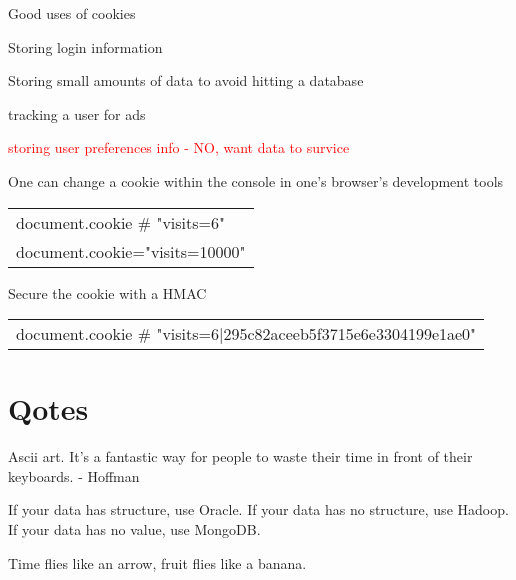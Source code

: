 \documentclass[12pt]{article}
\begin{document}
Good uses of cookies
\begin{list}{*}{
\setlength{\itemsep}{0pt}
\setlength{\parsep}{0pt}
\setlength{\topsep}{0pt}
\setlength{\partopsep}{0pt}
\setlength{\leftmargin}{2em}
\setlength{\labelwidth}{1.5em}
\setlength{\labelsep}{0.5em}
}
\item Storing login information
\item Storing small amounts of data to avoid hitting a database
\item tracking a user for ads
\item \textcolor{red}{storing user preferences info - NO, want data to survice}
\end{list}

One can change a cookie within the console in one's browser's development tools

\begin{tabular}{l}
document.cookie $\#$ "visits=6" \\
document.cookie="visits=10000"
\end{tabular}

Secure the cookie with a HMAC



\begin{tabular}{l}
document.cookie $\#$ "visits=6|295c82aceeb5f3715e6e3304199e1ae0" \\
\end{tabular}

\section{Qotes}

Ascii art. It's a fantastic way for people to waste their time in front of their keyboards. - Hoffman

If your data has structure, use Oracle. If your data has no structure, use Hadoop. If your data has no value, use MongoDB.

Time flies like an arrow, fruit flies like a banana.






\printindex
\end{document}
